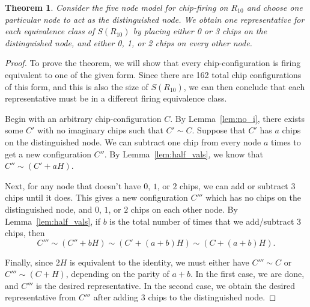 \documentclass[12p]{amsart}
\numberwithin{equation}{section}
\theoremstyle{plain}
\newtheorem{thm}{Theorem}[section]
\theoremstyle{definition}
\begin{document}
\begin{thm}\label{thm:representatives}
    Consider the five node model for chip-firing on $R_{10}$ and choose one particular node to act as \emph{the distinguished node}. We obtain one representative for each equivalence class of $S(R_{10})$ by placing either 0 or 3 chips on the distinguished node, and either 0, 1, or 2 chips on every other node. 
\end{thm}
\begin{proof}
    To prove the theorem, we will show that every chip-configuration is firing equivalent to one of the given form. Since there are 162 total chip configurations of this form, and this is also the size of $S(R_{10})$, we can then conclude that each representative must be in a different firing equivalence class.
    
    Begin with an arbitrary chip-configuration $C$. By Lemma~\ref{lem:no_i}, there exists some $C'$ with no imaginary chips such that $C' \sim C$. Suppose that $C'$ has $a$ chips on the distinguished node. We can subtract one chip from every node $a$ times to get a new configuration $C''$. By Lemma~\ref{lem:half_vals}, we know that $C'' \sim (C' + aH)$. 

    Next, for any node that doesn't have $0$, $1$, or $2$ chips, we can add or subtract 3 chips until it does. This gives a new configuration $C'''$ which has no chips on the distinguished node, and $0$, $1$, or $2$ chips on each other node. By Lemma~\ref{lem:half_vals}, if $b$ is the total number of times that we add/subtract $3$ chips, then \[C''' \sim (C'' + bH) \sim (C' + (a+b)H) \sim (C + (a+b)H).\]

    Finally, since $2H$ is equivalent to the identity, we must either have $C''' \sim C$ or $C''' \sim (C + H)$, depending on the parity of $a+b$. In the first case, we are done, and $C'''$ is the desired representative. In the second case, we obtain the desired representative from $C'''$ after adding $3$ chips to the distinguished node. 
\end{proof}
\end{document}
